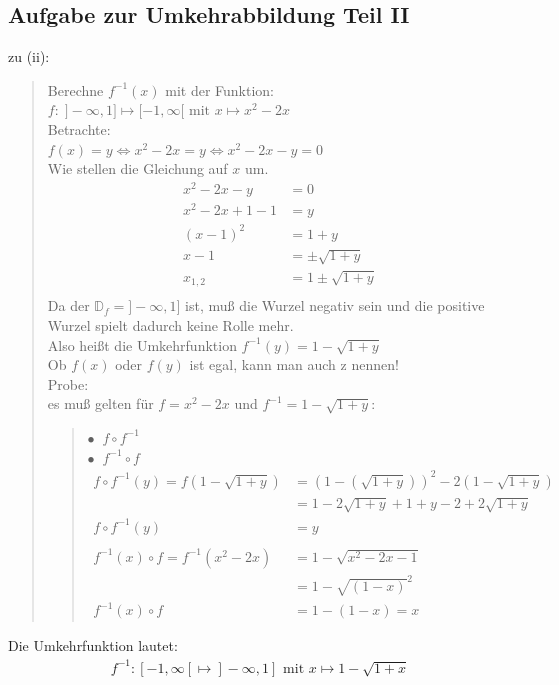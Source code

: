 \subsection{Aufgabe zur Umkehrabbildung Teil II}

zu (ii):
\begin{quote}
	Berechne $f^{-1}(x)$ mit der Funktion: $f:\;]-\infty,1]\longmapsto  [-1,\infty[ \text{ mit }x\longmapsto x^2-2x$\\
	Betrachte:\\
	$f(x)=y\Leftrightarrow x^2-2x=y\Leftrightarrow x^2-2x-y=0$\\
	Wie stellen die Gleichung auf $x$ um.\\
	\begin{align*}
		x^2-2x-y&=0\\
		x^2-2x+1-1&=y\\
		(x-1)^2&=1+y\\
		x-1&=\pm \sqrt{1+y}\\
		x_{1,2}&=1\pm \sqrt{1+y}\\
	\end{align*}
	Da der $\mathbb{D}_f=]-\infty,1]$ ist, muß die Wurzel negativ sein und die positive Wurzel spielt dadurch keine Rolle mehr.\\
	Also heißt die Umkehrfunktion $f^{-1}(y)=1-\sqrt{1+y}$\\
	Ob $f(x)$ oder $f(y)$ ist egal, kann man auch z nennen!\vspace*{2mm}\\
	Probe:\\
	es muß gelten für $f=x^2-2x$ und $f^{-1}=1-\sqrt{1+y}$:
	\begin{quote}
		$\bullet  \;\;f\circ f^{-1}$\\
		$\bullet \;\;f^{-1}\circ f$\\
		\begin{align*}
			f\circ f^{-1}(y)=f(1-\sqrt{1+y})&=(1-(\sqrt{1+y}))^2-2(1-\sqrt{1+y})\\
			&=1-2\sqrt{1+y}+1+y-2+2\sqrt{1+y}\\
			f\circ f^{-1}(y) &=y\\
			&\\
			f^{-1}(x)\circ f=f^{-1}(x^2-2x)&=1-\sqrt{x^2-2x-1}\\
			&=1-\sqrt{(1-x)}^2\\
			f^{-1}(x)\circ f&=1-(1-x)=x
		\end{align*}
		
		
	\end{quote}
	
\end{quote}
Die Umkehrfunktion lautet:\\
\begin{align*}
	f^{-1}:[-1,\infty[\longmapsto ]-\infty,1] \text{ mit }x\longmapsto 1-\sqrt{1+x}
\end{align*}
